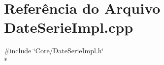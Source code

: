 \section{Referência do Arquivo Date\+Serie\+Impl.\+cpp}
\label{_date_serie_impl_8cpp}
{\ttfamily \#include \char`\"{}Core/\+Date\+Serie\+Impl.\+h\char`\"{}}\\*
